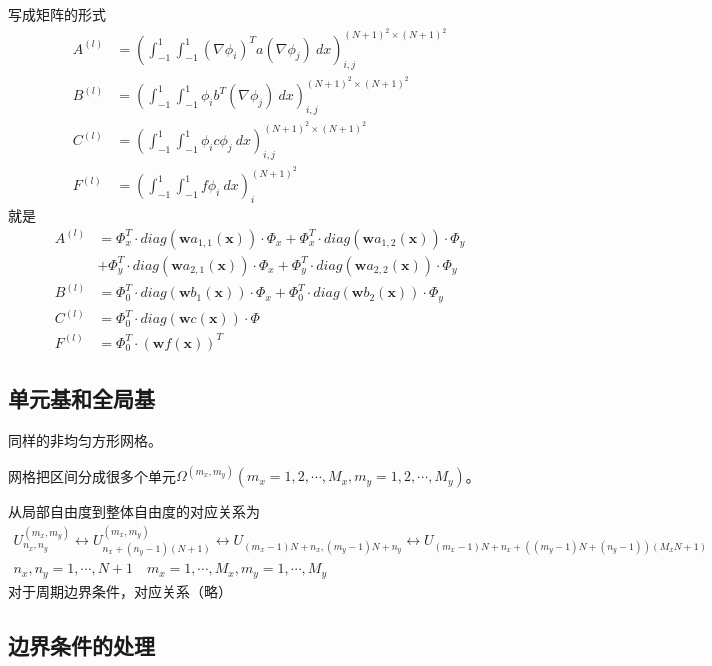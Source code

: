 \documentclass[12pt,a4paper]{article}
\begin{document}
写成矩阵的形式
\begin{align*}
A^{(l)} & = (\int_{-1}^{1} \int_{-1}^{1} (\nabla \phi_{i})^T a (\nabla \phi_{j}) \ dx)_{i,j}^{(N+1)^2 \times (N+1)^2} \\
B^{(l)} & = (\int_{-1}^{1} \int_{-1}^{1} \phi_{i} b^T (\nabla \phi_{j}) \ dx)_{i,j}^{(N+1)^2 \times (N+1)^2} \\
C^{(l)} & = (\int_{-1}^{1} \int_{-1}^{1} \phi_{i} c \phi_{j} \ dx)_{i,j}^{(N+1)^2 \times (N+1)^2} \\
F^{(l)} & = (\int_{-1}^{1} \int_{-1}^{1} f \phi_{i} \ dx)_{i}^{(N+1)^2}
\end{align*}
就是
\begin{align*}
A^{(l)} & = \Phi_x^T \cdot diag(\mathbf{w} a_{1,1}(\mathbf{x})) \cdot \Phi_x + \Phi_x^T \cdot diag(\mathbf{w} a_{1,2}(\mathbf{x})) \cdot \Phi_y \\
& + \Phi_y^T \cdot diag(\mathbf{w} a_{2,1}(\mathbf{x})) \cdot \Phi_x + \Phi_y^T \cdot diag(\mathbf{w} a_{2,2}(\mathbf{x})) \cdot \Phi_y \\
B^{(l)} & = \Phi_0^T \cdot diag(\mathbf{w} b_1(\mathbf{x})) \cdot \Phi_x + \Phi_0^T \cdot diag(\mathbf{w} b_2(\mathbf{x})) \cdot \Phi_y \\
C^{(l)} & = \Phi_0^T \cdot diag(\mathbf{w} c(\mathbf{x})) \cdot \Phi \\
F^{(l)} & = \Phi_0^T \cdot (\mathbf{w} f(\mathbf{x}))^T
\end{align*}

\subsection{单元基和全局基}

同样的非均匀方形网格。

网格把区间分成很多个单元$\Omega^{(m_x, m_y)} (m_x = 1,2,\cdots,M_x, m_y = 1,2,\cdots,M_y)$。

从局部自由度到整体自由度的对应关系为
\begin{align*}
U_{n_x, n_y}^{(m_x, m_y)} \leftrightarrow U_{n_x + (n_y-1)(N+1)}^{(m_x, m_y)} \leftrightarrow U_{(m_x-1)N + n_x, (m_y-1)N + n_y} \leftrightarrow U_{(m_x-1)N + n_x + ((m_y-1)N + (n_y-1))(M_x N + 1)} \\
n_x, n_y = 1,\cdots,N+1 \quad m_x = 1,\cdots,M_x, m_y = 1,\cdots,M_y
\end{align*}
对于周期边界条件，对应关系（略）

\subsection{边界条件的处理}
\end{document}
